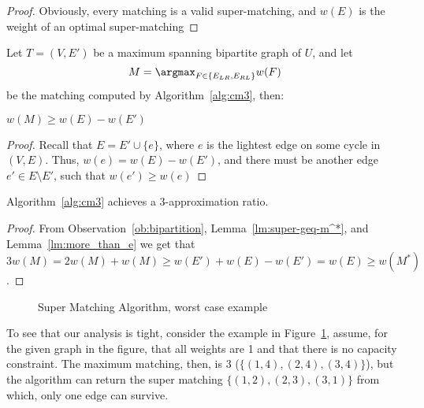 \begin{proof}
Obviously, every matching is a valid super-matching, 
and $w(E)$ is the weight of an optimal super-matching 
\end{proof}

Let $T = (V, E')$ be a maximum spanning bipartite graph of $U$,
and let 
$$M = \argmax_{F \in \{ E_{LR}, E_{RL} \}}{w(F)}$$
be the matching computed by Algorithm~\ref{alg:cm3}, then:

\begin{lemma}
\label{lm:more_than_e}
$w(M) \geq w(E) - w(E')$
\end{lemma}

\begin{proof}
Recall that $E = E' \cup \{e\}$, 
where $e$ is the lightest edge on some cycle in $(V, E)$. 
Thus, $w(e) = w(E) - w(E')$, 
and there must be another edge $e' \in E \setminus E'$, 
such that $w(e') \geq w(e)$
\end{proof}

\begin{theorem}
Algorithm~\ref{alg:cm3} achieves a 3-approximation ratio.
\end{theorem}

\begin{proof}
From Observation~\ref{ob:bipartition}, Lemma~\ref{lm:super-geq-m^*},
and Lemma~\ref{lm:more_than_e} we get that
$$ 3w(M) = 2w(M) + w(M) \geq w(E') + w(E) - w(E') = w(E) \geq w(M^*)$$.
\end{proof}

\begin{figure}
\centering

\caption{
\label{fig:3cm-tight-fig}
Super Matching Algorithm, worst case example
}
\end{figure}

To see that our analysis is tight, consider the example in Figure~\ref{fig:3cm-tight-fig},
assume, for the given graph in the figure, 
that all weights are 1 and that there is no capacity constraint.
The maximum matching, then, is 3 ($\{(1,4), (2,4), (3,4)\}$), 
but the algorithm can return the super matching $\{(1,2), (2,3), (3,1)\}$ from which, 
only one edge can survive.  
